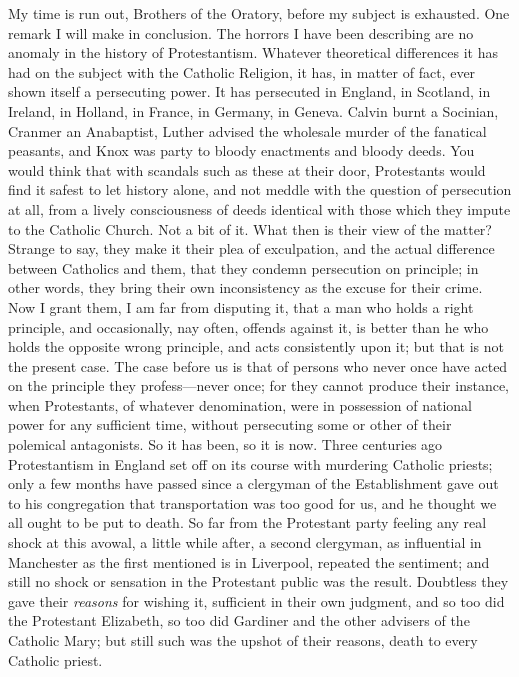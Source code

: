 My time is run out, Brothers of the Oratory, before my
subject is exhausted. One remark I will make in
conclusion. The horrors I have been describing are no
anomaly in the history of Protestantism. Whatever
theoretical differences it has had on the subject with
the Catholic Religion, it has, in matter of fact, ever
shown itself a persecuting power. It has persecuted in
England, in Scotland, in Ireland, in Holland, in France,
in Germany, in Geneva. Calvin burnt a Socinian, Cranmer
an Anabaptist, Luther advised the wholesale murder of the
fanatical peasants, and Knox was party to bloody
enactments and bloody deeds. You would think that with
scandals such as these at their door, Protestants would
find it safest to let history alone, and not meddle with
the question of persecution at all, from a lively
consciousness of deeds identical with those which they
impute to the Catholic Church. Not a bit of it. What then
is their view of the matter? Strange to say, they make it
their plea of exculpation, and the actual difference
between Catholics and them, that they condemn persecution
on principle; in other words, they bring their own
inconsistency as the excuse for their crime. Now I grant
them, I am far from disputing it, that a man who holds a
right principle, and occasionally, nay often, offends
against it, is better than he who holds the opposite
wrong principle, and acts consistently upon it; but that
is not the present case. The case before us is that of
persons who never once have acted on the principle they
profess—never once; for they cannot produce their
instance, when Protestants, of whatever denomination,
were in possession of national power for any sufficient
time, without persecuting some or other of their
polemical antagonists. So it has been, so it is now.
Three centuries ago Protestantism in England set off on
its course with murdering Catholic priests; only a few
months have passed since a clergyman of the Establishment
gave out to his congregation that transportation was too
good for us, and he thought we all ought to be put to
death. So far from the Protestant party feeling any real
shock at this avowal, a little while after, a second
clergyman, as influential in Manchester as the first
mentioned is in Liverpool, repeated the sentiment; and
still no shock or sensation in the Protestant public was
the result. Doubtless they gave their \emph{reasons} for wishing
it, sufficient in their own judgment, and so too did the
Protestant Elizabeth, so too did Gardiner and the other
advisers of the Catholic Mary; but still such was the
upshot of their reasons, death to every Catholic priest.
